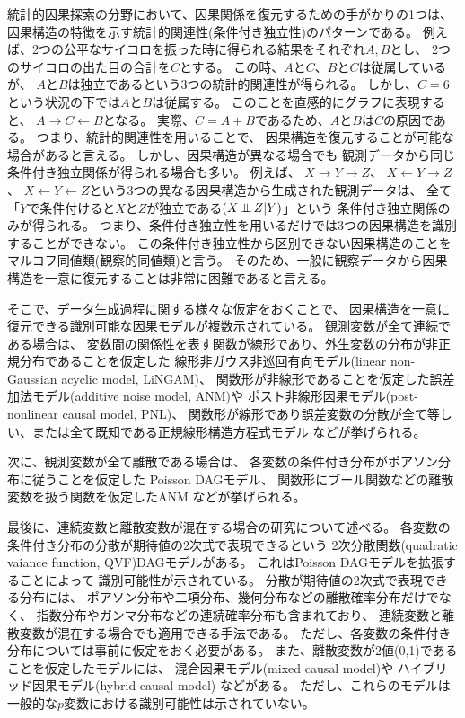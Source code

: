 統計的因果探索の分野において、因果関係を復元するための手がかりの1つは、
因果構造の特徴を示す統計的関連性(条件付き独立性)のパターンである\cite{Pearl2009-oh}。
例えば、2つの公平なサイコロを振った時に得られる結果をそれぞれ$A, B$とし、
2つのサイコロの出た目の合計を$C$とする。
この時、$A$と$C$、$B$と$C$は従属しているが、
$A$と$B$は独立であるという3つの統計的関連性が得られる。
しかし、$C=6$という状況の下では$A$と$B$は従属する。
このことを直感的にグラフに表現すると、
$A \rightarrow C \leftarrow B$となる。
実際、$C=A+B$であるため、$A$と$B$は$C$の原因である。
つまり、統計的関連性を用いることで、
因果構造を復元することが可能な場合があると言える。
しかし、因果構造が異なる場合でも
観測データから同じ条件付き独立関係が得られる場合も多い。
例えば、
$X \rightarrow Y \rightarrow Z$、
$X \leftarrow Y \rightarrow Z$、
$X \leftarrow Y \leftarrow Z$という3つの異なる因果構造から生成された観測データは、
全て「$Y$で条件付けると$X$と$Z$が独立である$(X \mathop{\,\perp\!\!\!\!\!\!\perp\,} Z | Y)$」という
条件付き独立関係のみが得られる。
つまり、条件付き独立性を用いるだけでは3つの因果構造を識別することができない。
この条件付き独立性から区別できない因果構造のことをマルコフ同値類(観察的同値類)と言う\cite{Pearl2009-oh}。
そのため、一般に観察データから因果構造を一意に復元することは非常に困難であると言える。

そこで、データ生成過程に関する様々な仮定をおくことで、
因果構造を一意に復元できる識別可能な因果モデルが複数示されている。
観測変数が全て連続である場合は、
変数間の関係性を表す関数が線形であり、外生変数の分布が非正規分布であることを仮定した
線形非ガウス非巡回有向モデル(linear non-Gaussian acyclic model, LiNGAM)\cite{Shimizu2006-yu}、
関数形が非線形であることを仮定した誤差加法モデル(additive noise model, ANM)\cite{Hoyer2008-oo}や
ポスト非線形因果モデル(post-nonlinear causal model, PNL)\cite{Zhang2012-ay}、
関数形が線形であり誤差変数の分散が全て等しい、または全て既知である正規線形構造方程式モデル\cite{Peters2013-eb}
などが挙げられる。

次に、観測変数が全て離散である場合は、
各変数の条件付き分布がポアソン分布に従うことを仮定した
Poisson DAGモデル\cite{Park2015-tj}、
関数形にブール関数などの離散変数を扱う関数を仮定したANM\cite{Peters2011-ew}
などが挙げられる。

最後に、連続変数と離散変数が混在する場合の研究について述べる。
各変数の条件付き分布の分散が期待値の2次式で表現できるという
2次分散関数(quadratic vaiance function, QVF)DAGモデル\cite{Park2017-hw}がある。
これはPoisson DAGモデル\cite{Park2015-tj}を拡張することによって
識別可能性が示されている。
分散が期待値の2次式で表現できる分布には、
ポアソン分布や二項分布、幾何分布などの離散確率分布だけでなく、
指数分布やガンマ分布などの連続確率分布も含まれており、
連続変数と離散変数が混在する場合でも適用できる手法である。
ただし、各変数の条件付き分布については事前に仮定をおく必要がある。
また、離散変数が2値(0,1)であることを仮定したモデルには、
混合因果モデル(mixed causal model)\cite{Wenjuan2018-nm}や
ハイブリッド因果モデル(hybrid causal model)\cite{Li2018-aw}
などがある。
ただし、これらのモデルは一般的な$p$変数における識別可能性は示されていない。
